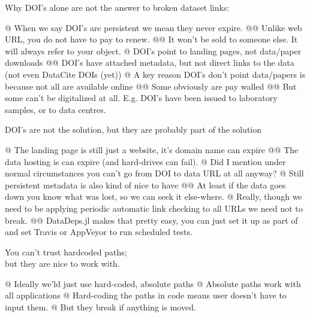 \documentclass[dvipsnames]{beamer}
\newcommand{\inlinecode}[1]{\mbox{\color{Purple}{\texttt{\detokenize{#1}}}}}
\let\oldnote\note
\renewcommand{\note}{\oldnote[item]}
\renewcommand{\emph}{\alert}
\begin{document}
\begin{frame}[fragile]{Why DOI's alone are not the answer to broken dataset links:}
	\small
	\begin{easylist}[itemize]
		@ When we say DOI's are persistent we mean they never expire.
		@@ Unlike web URL, you do not have to pay to renew.
		@@ It won't be sold to someone else. It will always refer to your object.
		@ DOI's point to landing pages, not data/paper downloads
		@@ DOI's have attached metadata, but not direct links to the data (not even DataCite DOIs (yet))
		@ A key reason DOI's don't point data/papers is because not all are available online
		@@ Some obviously are pay walled
		@@ But some can't be digitalized at all. E.g. DOI's have been issued to laboratory samples, or to data centres.		
	\end{easylist}
\end{frame}
\begin{frame}[fragile]{DOI's are not the solution, but they are probably part of the solution}
	\begin{easylist}[itemize]
		@ The landing page is still just a website, it's domain name \alert{can expire}
		@@ The data hosting is can expire (and hard-drives can fail).
		@ Did I mention under normal circumstances you can't go from DOI to data URL at all anyway?
		@ Still persistent metadata is also kind of nice to have
		@@ At least if the data goes down you know what was lost, so we can seek it else-where.
		@ Really, though we need to be applying periodic automatic link checking to all URLs we need not to break.
		@@ DataDeps.jl makes that pretty easy, you can just set it up as part of \inlinecode{runtests.jl} and set Travis or AppVeyor to run scheduled tests.
	\end{easylist}
\end{frame}


\begin{frame}[fragile]{You can't trust hardcoded paths; \\ but they are nice to work with.}
	
	\begin{easylist}[itemize]
		@ Ideally we'ld just use \alert{hard-coded, absolute} paths
		@ Absolute paths work with all \emph{applications}
		@ Hard-coding the paths in code means user doesn't have to input them.
		@ But they \emph{break} if anything is \emph{moved}. \note{relative paths are less so}
	\end{easylist}
\end{frame}
\end{document}

